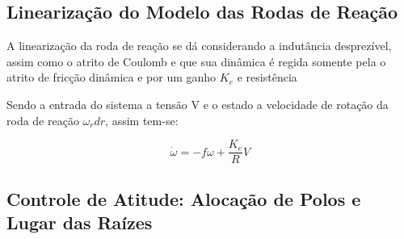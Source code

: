 \subsection{Linearização do Modelo das Rodas de Reação}\label{sec:3.1.6.3}

A linearização da roda de reação se dá considerando a indutância desprezível, assim como o atrito de Coulomb e que sua dinâmica é regida somente pela o atrito de fricção dinâmica e por um ganho $K_e$ e resistência

Sendo a entrada do sistema a tensão V e o estado a velocidade de rotação da roda de reação $\omega_rdr$, assim tem-se:

\begin{equation}
	\dot{\omega} = -f\omega+\frac{K_e}{R}V
\end{equation}



\subsection{Controle de Atitude: Alocação de Polos e Lugar das Raízes}\label{sec:3.1.6}

